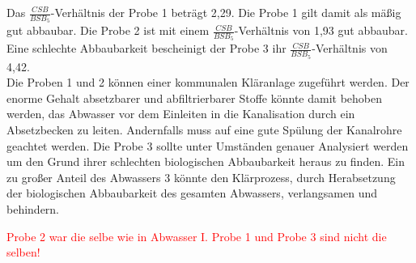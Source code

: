 
Das $\frac{CSB}{BSB_5}$-Verhältnis der Probe 1 beträgt 2,29. Die Probe 1 gilt damit als mäßig gut abbaubar.
Die Probe 2 ist mit einem $\frac{CSB}{BSB_5}$-Verhältnis von 1,93 gut abbaubar. Eine schlechte Abbaubarkeit bescheinigt der Probe 3 ihr $\frac{CSB}{BSB_5}$-Verhältnis von 4,42.
\\




Die Proben 1 und 2 können einer kommunalen Kläranlage zugeführt werden. Der enorme Gehalt absetzbarer und abfiltrierbarer Stoffe könnte damit behoben werden, das Abwasser vor dem Einleiten in die Kanalisation durch ein Absetzbecken zu leiten. Andernfalls muss auf eine gute Spülung der Kanalrohre geachtet werden. Die Probe 3 sollte unter Umständen genauer Analysiert werden um den Grund ihrer schlechten biologischen Abbaubarkeit heraus zu finden. Ein zu großer Anteil des Abwassers 3 könnte den Klärprozess, durch Herabsetzung der biologischen Abbaubarkeit des gesamten Abwassers, verlangsamen und behindern. 



\textcolor{red}{Probe 2 war die selbe wie in Abwasser I. Probe 1 und Probe 3 sind nicht die selben!}


